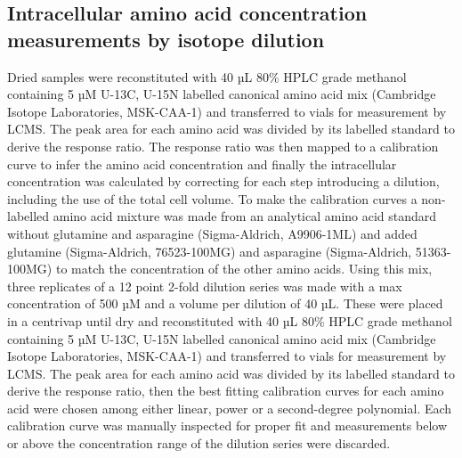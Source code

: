 \subsection{Intracellular amino acid concentration measurements by isotope dilution}
Dried samples were reconstituted with 40 µL 80\% HPLC grade methanol containing 5 µM U-13C, U-15N labelled canonical amino acid mix (Cambridge Isotope Laboratories, MSK-CAA-1) and transferred to vials for measurement by LCMS.
The peak area for each amino acid was divided by its labelled standard to derive the response ratio.
The response ratio was then mapped to a calibration curve to infer the amino acid concentration and finally the intracellular concentration was calculated by correcting for each step introducing a dilution, including the use of the total cell volume.
To make the calibration curves a non-labelled amino acid mixture was made from an analytical amino acid standard without glutamine and asparagine (Sigma-Aldrich, A9906-1ML) and added glutamine (Sigma-Aldrich, 76523-100MG) and asparagine (Sigma-Aldrich, 51363-100MG) to match the concentration of the other amino acids.
Using this mix, three replicates of a 12 point 2-fold dilution series was made with a max concentration of 500 µM and a volume per dilution of 40 µL.
These were placed in a centrivap until dry and reconstituted with 40 µL 80\% HPLC grade methanol containing 5 µM U-13C, U-15N labelled canonical amino acid mix (Cambridge Isotope Laboratories, MSK-CAA-1) and transferred to vials for measurement by LCMS.
The peak area for each amino acid was divided by its labelled standard to derive the response ratio, then the best fitting calibration curves for each amino acid were chosen among either linear, power or a second-degree polynomial.
Each calibration curve was manually inspected for proper fit and measurements below or above the concentration range of the dilution series were discarded.

